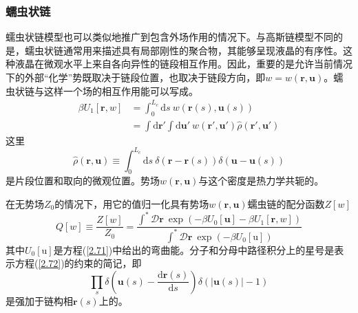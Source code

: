 \subsubsection{蠕虫状链}
蠕虫状链模型也可以类似地推广到包含外场作用的情况下。与高斯链模型不同的是，蠕虫状链通常用来描述具有局部刚性的聚合物，其能够呈现液晶的有序性。这种液晶在微观水平上来自各向异性的链段相互作用。因此，重要的是允许当前情况下的外部“化学”势既取决于链段位置，也取决于链段方向，即$w=w(\mathbf{r},\mathbf{u})$。蠕虫状链与这样一个场的相互作用能可以写成。
\begin{equation}\label{3.34}
\begin{aligned}
\beta U_1[\mathbf{r},w]&=\int_0^{L_c}\mathrm{d}s~w(\mathbf{r}(s),\mathbf{u}(s))\\
&=\int\mathrm{d}\mathbf{r}'\int\mathrm{d}\mathbf{u}'~w(\mathbf{r}',\mathbf{u}')\hat{\rho}(\mathbf{r}',\mathbf{u}')
\end{aligned}
\end{equation}
这里
\begin{equation}\label{3.35}
\hat{\rho}(\mathbf{r},\mathbf{u})\equiv\int_0^{L_c}\mathrm{d}s~\delta(\mathbf{r}-\mathbf{r}(s))\delta(\mathbf{u}-\mathbf{u}(s))
\end{equation}
是片段位置和取向的微观位置。势场$w(\mathbf{r},\mathbf{u})$与这个密度是热力学共轭的。

在无势场$Z_0$的情况下，用它的值归一化具有势场$w(\mathbf{r},\mathbf{u})$蠕虫链的配分函数$Z[w]$
\begin{equation}\label{3.36}
Q[w]\equiv\frac{Z[w]}{Z_0}=\frac{\int^*\mathcal{D}\mathbf{r}~\exp(-\beta U_0[\mathbf{u}]-\beta U_1[\mathbf{r},w])}{\int^*\mathcal{D}\mathbf{r}~\exp(-\beta U_0[\mathrm{u}])}
\end{equation}
其中$U_0[\mathrm{u}]$是方程(\ref{2.71})中给出的弯曲能。分子和分母中路径积分上的星号是表示方程(\ref{2.72})的约束的简记，即
\begin{equation}\label{3.37}
\prod\limits_s\delta\left(\mathbf{u}(s)-\frac{\mathrm{d}\mathbf{r}(s)}{\mathrm{d}s}\right)\delta(\left|\mathbf{u}(s)\right|-1)
\end{equation}
是强加于链构相$\mathbf{r}(s)$上的。

